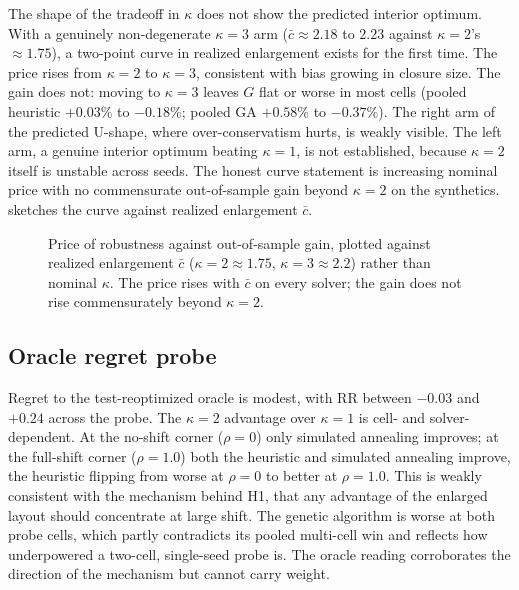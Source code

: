 \documentclass[preprint,review,11pt,authoryear]{elsarticle}
\begin{document}
The shape of the tradeoff in $\kappa$ does not show the predicted interior optimum. With a genuinely non-degenerate $\kappa=3$ arm ($\bar c \approx 2.18$ to $2.23$ against $\kappa=2$'s $\approx 1.75$), a two-point curve in realized enlargement exists for the first time. The price rises from $\kappa=2$ to $\kappa=3$, consistent with bias growing in closure size. The gain does not: moving to $\kappa=3$ leaves $G$ flat or worse in most cells (pooled heuristic $+0.03\%$ to $-0.18\%$; pooled GA $+0.58\%$ to $-0.37\%$). The right arm of the predicted U-shape, where over-conservatism hurts, is weakly visible. The left arm, a genuine interior optimum beating $\kappa=1$, is not established, because $\kappa=2$ itself is unstable across seeds. The honest curve statement is increasing nominal price with no commensurate out-of-sample gain beyond $\kappa=2$ on the synthetics.  sketches the curve against realized enlargement $\bar c$.

\begin{figure}[t]
  \centering
  \caption{Price of robustness against out-of-sample gain, plotted against realized enlargement $\bar c$ ($\kappa=2 \approx 1.75$, $\kappa=3 \approx 2.2$) rather than nominal $\kappa$. The price rises with $\bar c$ on every solver; the gain does not rise commensurately beyond $\kappa=2$.}
  \label{fig:rc-tradeoff}
\end{figure}

\subsection{Oracle regret probe}\label{sec:rc-oracle-res}

Regret to the test-reoptimized oracle is modest, with $\mathrm{RR}$ between $-0.03$ and $+0.24$ across the probe. The $\kappa=2$ advantage over $\kappa=1$ is cell- and solver-dependent. At the no-shift corner ($\rho=0$) only simulated annealing improves; at the full-shift corner ($\rho=1.0$) both the heuristic and simulated annealing improve, the heuristic flipping from worse at $\rho=0$ to better at $\rho=1.0$. This is weakly consistent with the mechanism behind H1, that any advantage of the enlarged layout should concentrate at large shift. The genetic algorithm is worse at both probe cells, which partly contradicts its pooled multi-cell win and reflects how underpowered a two-cell, single-seed probe is. The oracle reading corroborates the direction of the mechanism but cannot carry weight.
\end{document}
